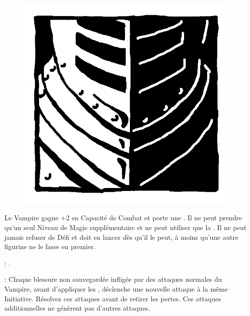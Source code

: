 
\begin{figure}
\centering
\includegraphics[width=\logosize]{pics/logo_brotherhood.png}
\end{figure}
Le Vampire gagne +2 en Capacité de Combat et porte une \platearmour{}. Il ne peut prendre qu'un seul Niveau de Magie supplémentaire et ne peut utiliser que la \Pathof{} \necromancy{}. Il ne peut jamais refuser de Défi et doit en lancer dès qu'il le peut, à moins qu'une autre figurine ne le fasse en premier.

\vspace{0.5cm}
\bloodtie{} : \textbf{\vampireknights}.

\vspace{0.5cm}
\ancientbloodpower{} : \textbf{\crimsonrage}\dotfill{}\newline%
Chaque blessure non sauvegardée infligée par des attaques normales du Vampire, avant d'appliquer les \multiplewounds{}{}, déclenche une nouvelle attaque à la même Initiative. Résolvez ces attaques avant de retirer les pertes. Ces attaques additionnelles ne génèrent pas d'autres attaques.


